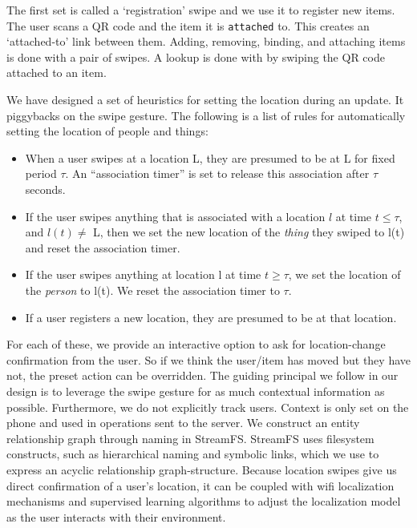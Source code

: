 The first set is called a `registration' swipe and we use it to register new items.  The user scans a QR code and the item it is \texttt{attached}
to.  This creates an `attached-to' link between them.  Adding, removing, binding, and attaching items is done with a pair of swipes.
A lookup is done with by swiping the QR code attached to an item.

We have designed a set of heuristics for setting the location during an update.  It piggybacks on the swipe gesture.
The following is a list of rules for automatically setting the location of people and things:

\begin{itemize}
\item When a user swipes at a location L, they are presumed to be at L for fixed period $\tau$.  An ``association timer'' is set to 
        release this association after $\tau$ seconds.
\item If the user swipes anything that is associated with a location $l$ at time $t \le \tau$, and $l(t)\ne$ L, 
        then we set the new location of the \emph{thing} they swiped to l(t) and reset the association timer.
\item If the user swipes anything at location l at time $t \ge \tau$, we set the location of the \emph{person} to l(t).
        We reset the association timer to $\tau$.
\item If a user registers a new location, they are presumed to be at that location.
\end{itemize}
\vspace{0.08in}


For each of these, we provide an interactive option to ask for location-change confirmation from the user.  So if we think the
user/item has moved but they have not, the preset action can be overridden.  The guiding principal we follow in our design
is to leverage the swipe gesture for as much contextual information as possible.  Furthermore, we do not explicitly track users.
Context is only set on the phone and used in operations sent to the server.  
We construct an entity relationship graph through 
naming in StreamFS.  StreamFS uses filesystem constructs, such as hierarchical naming and symbolic
links, which we use to express an acyclic relationship graph-structure.
Because location swipes give us direct confirmation of a user's location, it can be coupled with wifi localization mechanisms
and supervised learning algorithms to adjust the localization model as the user interacts with their environment. 

